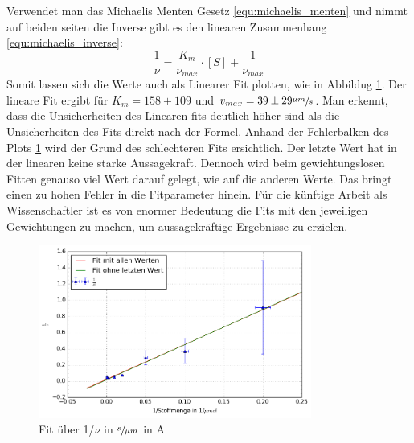 Verwendet man das Michaelis Menten Gesetz \ref{equ:michaelis_menten} und nimmt auf beiden seiten die Inverse gibt es den linearen Zusammenhang \ref{equ:michaelis_inverse}:
\begin{equation}
  \frac{1}{\nu} = \frac{K_m}{\nu_{max}} \cdot [S] + \frac{1}{\nu_{max}}
  \label{equ:michaelis_inverse}
\end{equation}
Somit lassen sich die Werte auch als Linearer Fit plotten, wie in Abbildug \ref{fig:1_over_speed}.
Der lineare Fit ergibt für $K_m = 158 \pm 109$ und $v_{max} = 39 \pm 29 \sfrac{\mu m}{s}$.
Man erkennt, dass die Unsicherheiten des Linearen fits
deutlich höher sind als die Unsicherheiten des Fits direkt nach der Formel.
Anhand der Fehlerbalken des Plots \ref{fig:1_over_speed} wird der Grund des schlechteren Fits ersichtlich. Der letzte Wert hat in der linearen keine starke Aussagekraft. Dennoch wird beim gewichtungslosen Fitten genauso viel Wert darauf gelegt, wie auf die anderen Werte.
Das bringt einen zu hohen Fehler in die Fitparameter hinein.
Für die künftige Arbeit als Wissenschaftler ist es von enormer Bedeutung die Fits mit den jeweiligen
Gewichtungen zu machen, um aussagekräftige Ergebnisse zu erzielen.
\begin{figure}[]
  \centering
  \includegraphics[width=0.8\textwidth]{bilder/both_fits_1over.png}
  \caption{Fit über 1/$\nu$  in $\sfrac{s}{\mu m}$ in A}
  \label{fig:1_over_speed}
\end{figure}

